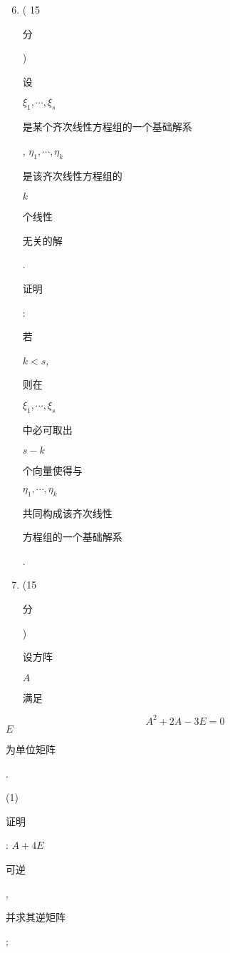 \documentclass[10pt]{article}
\begin{document}
\begin{enumerate}
  \setcounter{enumi}{5}
  \item ( 15 \begin{CJK}{UTF8}{mj}分\end{CJK}) \begin{CJK}{UTF8}{mj}设\end{CJK} $\xi_{1}, \cdots, \xi_{s}$ \begin{CJK}{UTF8}{mj}是某个齐次线性方程组的一个基础解系\end{CJK}, $\eta_{1}, \cdots, \eta_{k}$ \begin{CJK}{UTF8}{mj}是该齐次线性方程组的\end{CJK} $k$ \begin{CJK}{UTF8}{mj}个线性\end{CJK} \begin{CJK}{UTF8}{mj}无关的解\end{CJK}. \begin{CJK}{UTF8}{mj}证明\end{CJK}: \begin{CJK}{UTF8}{mj}若\end{CJK} $k<s$, \begin{CJK}{UTF8}{mj}则在\end{CJK} $\xi_{1}, \cdots, \xi_{s}$ \begin{CJK}{UTF8}{mj}中必可取出\end{CJK} $s-k$ \begin{CJK}{UTF8}{mj}个向量使得与\end{CJK} $\eta_{1}, \cdots, \eta_{k}$ \begin{CJK}{UTF8}{mj}共同构成该齐次线性\end{CJK} \begin{CJK}{UTF8}{mj}方程组的一个基础解系\end{CJK}.

  \item (15 \begin{CJK}{UTF8}{mj}分\end{CJK}) \begin{CJK}{UTF8}{mj}设方阵\end{CJK} $A$ \begin{CJK}{UTF8}{mj}满足\end{CJK}

\end{enumerate}
$$
A^{2}+2 A-3 E=0
$$
$E$ \begin{CJK}{UTF8}{mj}为单位矩阵\end{CJK}.

(1) \begin{CJK}{UTF8}{mj}证明\end{CJK}: $A+4 E$ \begin{CJK}{UTF8}{mj}可逆\end{CJK}, \begin{CJK}{UTF8}{mj}并求其逆矩阵\end{CJK};
\end{document}
